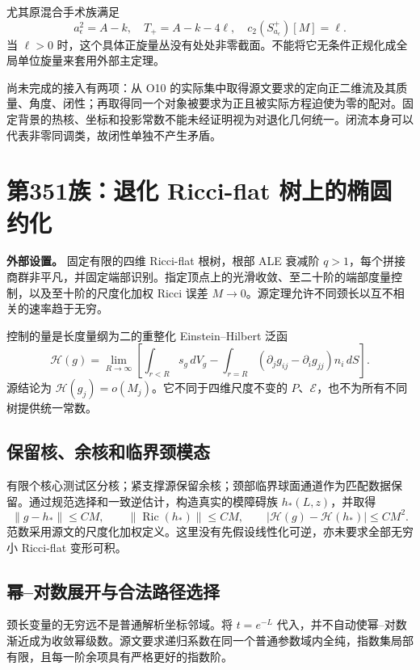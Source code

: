 \documentclass[UTF8,11pt,fontset=none]{ctexart}
\theoremstyle{definition}
\theoremstyle{remark}
\begin{document}
尤其原混合手术族满足 \[
 a_\epsilon^2=A-k,\quad T_+=A-k-4\ell,\quad
 c_2(S^+_{a_\epsilon})[M]=\ell.
\tag{2.5}
\] 当 \(\ell>0\) 时，这个具体正旋量丛没有处处非零截面。不能将它无条件正规化成全局单位旋量来套用外部主定理。

尚未完成的接入有两项：从 O10 的实际集中取得源文要求的定向正二维流及其质量、角度、闭性；再取得同一个对象被要求为正且被实际方程迫使为零的配对。固定背景的热核、坐标和投影常数不能未经证明视为对退化几何统一。闭流本身可以代表非零同调类，故闭性单独不产生矛盾。\cite{R01,R02}

\section{第351族：退化 Ricci-flat 树上的椭圆约化}\label{v2-ux7b2c351ux65cfux9000ux5316-ricci-flat-ux6811ux4e0aux7684ux692dux5706ux7ea6ux5316}

\textbf{外部设置。} 固定有限的四维 Ricci-flat 根树，根部 ALE 衰减阶 \(q>1\)，每个拼接商群非平凡，并固定端部识别。指定顶点上的光滑收敛、至二十阶的端部度量控制，以及至十阶的尺度化加权 Ricci 误差 \(M\to0\)。源定理允许不同颈长以互不相关的速率趋于无穷。\cite{OAI351Tree}

控制的量是长度量纲为二的重整化 Einstein--Hilbert 泛函 \[
 \mathscr H(g)=\lim_{R\to\infty}
 \left[\int_{r<R}s_g\,dV_g-
 \int_{r=R}(\partial_jg_{ij}-\partial_ig_{jj})n_i\,dS\right].
\] 源结论为 \(\mathscr H(g_j)=o(M_j)\)。它不同于四维尺度不变的 \(P\)、\(\mathcal E\)，也不为所有不同树提供统一常数。

\subsection{保留核、余核和临界颈模态}\label{v2-ux4fddux7559ux6838ux4f59ux6838ux548cux4e34ux754cux9888ux6a21ux6001}

有限个核心测试区分核；紧支撑源保留余核；颈部临界球面通道作为匹配数据保留。通过规范选择和一致逆估计，构造真实的模障碍族 \(h_*(L,z)\)，并取得 \[
 \|g-h_*\|\le CM,\qquad
 \|\operatorname{Ric}(h_*)\|\le CM,\qquad
 |\mathscr H(g)-\mathscr H(h_*)|\le CM^2.
\tag{2.6}
\] 范数采用源文的尺度化加权定义。这里没有先假设线性化可逆，亦未要求全部无穷小 Ricci-flat 变形可积。

\subsection{幂--对数展开与合法路径选择}\label{v2-ux5e42ux5bf9ux6570ux5c55ux5f00ux4e0eux5408ux6cd5ux8defux5f84ux9009ux62e9}

颈长变量的无穷远不是普通解析坐标邻域。将 \(t=e^{-L}\) 代入，并不自动使幂--对数渐近成为收敛幂级数。源文要求递归系数在同一个普通参数域内全纯，指数集局部有限，且每一阶余项具有严格更好的指数阶。
\end{document}
